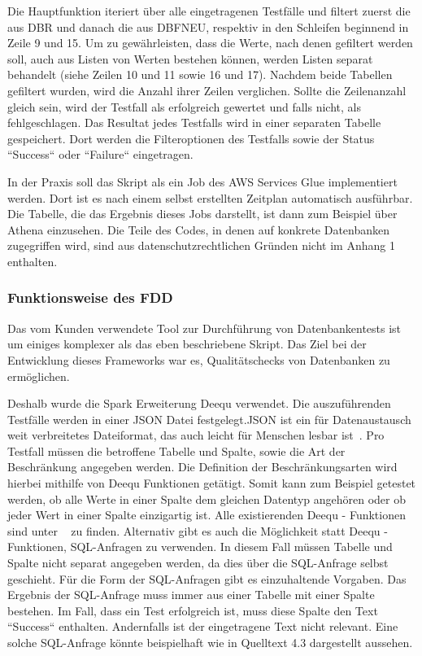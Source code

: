 Die Hauptfunktion iteriert über alle eingetragenen Testfälle und filtert zuerst die aus \ac{DBR} und danach die aus \ac{DBFNEU}, respektiv in den Schleifen beginnend in Zeile 9 und 15. Um zu gewährleisten, dass die Werte, nach denen gefiltert werden soll, auch aus Listen von Werten bestehen können, werden Listen separat behandelt (siehe Zeilen 10 und 11 sowie 16 und 17). Nachdem beide Tabellen gefiltert wurden, wird die Anzahl ihrer Zeilen verglichen. Sollte die Zeilenanzahl gleich sein, wird der Testfall als erfolgreich gewertet und falls nicht, als fehlgeschlagen. 
\newline
Das Resultat jedes Testfalls wird in einer separaten Tabelle gespeichert. Dort werden die Filteroptionen des Testfalls sowie der Status ``Success`` oder ``Failure`` eingetragen.
\newline


In der Praxis soll das Skript als ein Job  des \ac{AWS} Services Glue implementiert werden. Dort ist es nach einem selbst erstellten Zeitplan automatisch ausführbar. Die Tabelle, die das Ergebnis dieses Jobs darstellt, ist dann zum Beispiel über Athena  einzusehen. Die Teile des Codes, in denen auf konkrete Datenbanken zugegriffen wird, sind aus datenschutzrechtlichen Gründen nicht im Anhang 1 enthalten.


\subsubsection{Funktionsweise des \ac{FDD}}
Das vom Kunden verwendete Tool zur Durchführung von Datenbankentests ist um einiges komplexer als das eben beschriebene Skript. Das Ziel bei der Entwicklung dieses Frameworks war es, Qualitätschecks von Datenbanken zu ermöglichen. 
\newline


Deshalb wurde die Spark Erweiterung Deequ verwendet. Die auszuführenden Testfälle werden in einer \ac{JSON} Datei festgelegt.\ac{JSON} ist ein für Datenaustausch weit verbreitetes Dateiformat, das auch leicht für Menschen lesbar ist~\cite{Smith.2015}. Pro Testfall müssen die betroffene Tabelle und Spalte, sowie die Art der Beschränkung angegeben werden. Die Definition der Beschränkungsarten wird hierbei mithilfe von Deequ Funktionen getätigt. Somit kann zum Beispiel getestet werden, ob alle Werte in einer Spalte dem gleichen Datentyp angehören oder ob jeder Wert in einer Spalte einzigartig ist. Alle existierenden Deequ - Funktionen sind unter ~\cite{Deequ.} zu finden. Alternativ gibt es auch die Möglichkeit statt Deequ - Funktionen, \ac{SQL}-Anfragen zu verwenden. In diesem Fall müssen Tabelle und Spalte nicht separat angegeben werden, da dies über die \ac{SQL}-Anfrage selbst geschieht. Für die Form der \ac{SQL}-Anfragen gibt es einzuhaltende Vorgaben. Das Ergebnis der \ac{SQL}-Anfrage muss immer aus einer Tabelle mit einer Spalte bestehen. Im Fall, dass ein Test erfolgreich ist, muss diese Spalte den Text ``Success`` enthalten. Andernfalls ist der eingetragene Text nicht relevant. Eine solche \ac{SQL}-Anfrage könnte beispielhaft wie in Quelltext 4.3 dargestellt aussehen.


